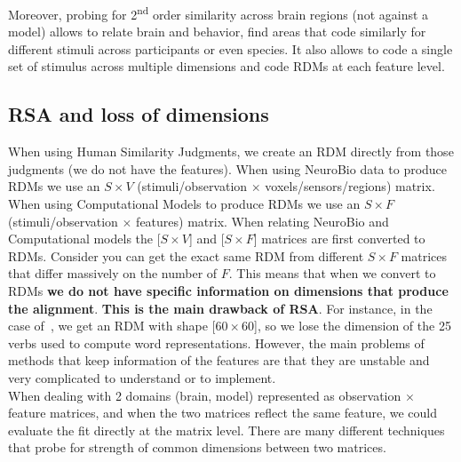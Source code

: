 Moreover, probing for 2\textsuperscript{nd} order similarity across brain regions (not against a model) allows to relate brain and behavior, find areas that code similarly for different stimuli across participants or even species. It also allows to code a single set of stimulus across multiple dimensions and code RDMs at each feature level.

\subsection{RSA and loss of dimensions}
When using Human Similarity Judgments, we create an RDM directly from those judgments (we do not have the features). 
When using NeuroBio data to produce RDMs we use an $S \times V$ (stimuli/observation $\times$ voxels/sensors/regions) matrix.
When using Computational Models to produce RDMs we use an $S \times F$ (stimuli/observation $\times$ features) matrix.
When relating NeuroBio and Computational models the [$S \times V$] and [$S \times F$] matrices are first converted to RDMs.
Consider you can get the exact same RDM from different $S \times F$ matrices that differ massively on the number of $F$. This means that when we convert to RDMs \textbf{we do not have specific information on dimensions that produce the alignment}.
\textbf{This is the main drawback of RSA}.
For instance, in the case of~\cite{Mitchell2008PredictingHB}, we get an RDM with shape [$60 \times 60$], so we lose the dimension of the 25 verbs used to compute word representations. However, the main problems of methods that keep information of the features are that they are unstable and very complicated to understand or to implement.\\

When dealing with 2 domains (brain, model) represented as observation $\times$ feature matrices, and when the two matrices reflect the same feature, we could evaluate the fit directly at the matrix level. There are many different techniques that probe for strength of common dimensions between two matrices.

